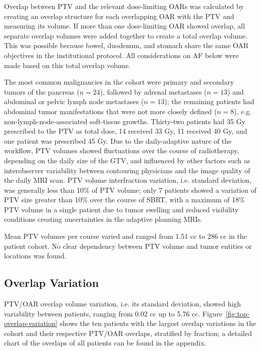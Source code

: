 \documentclass[11pt]{article}
\begin{document}
Overlap between PTV and the relevant dose-limiting OARs was calculated by creating an overlap structure for each overlapping OAR with the PTV and measuring its volume. If more than one dose-limiting OAR showed overlap, all separate overlap volumes were added together to create a total overlap volume. This was possible because bowel, duodenum, and stomach share the same OAR objectives in the institutional protocol. All considerations on AF below were made based on this total overlap volume.

The most common malignancies in the cohort were primary and secondary tumors of the pancreas ($n=24$), followed by adrenal metastases ($n=13$) and abdominal or pelvic lymph node metastases ($n=13$); the remaining patients had abdominal tumor manifestations that were not more closely defined ($n=8$), e.g. non-lymph-node-associated soft-tissue growths. Thirty-two patients had 35 Gy prescribed to the PTV as total dose, 14 received 33 Gy, 11 received 40 Gy, and one patient was prescribed 45 Gy. Due to the daily-adaptive nature of the workflow, PTV volumes showed fluctuations over the course of radiotherapy, depending on the daily size of the GTV, and influenced by other factors such as interobserver variability between contouring physicians and the image quality of the daily MRI scan. PTV volume interfraction variation, i.e. standard deviation, was generally less than 10\% of PTV volume; only 7 patients showed a variation of PTV size greater than 10\% over the course of SBRT, with a maximum of 18\% PTV volume in a single patient due to tumor swelling and reduced visibility conditions creating uncertainties in the adaptive planning MRIs.

Mean PTV volumes per course varied and ranged from 1.51 cc to 286 cc in the patient cohort. No clear dependency between PTV volume and tumor entities or locations was found.

\subsection{Overlap Variation}

PTV/OAR overlap volume variation, i.e. its standard deviation, showed high variability between patients, ranging from 0.02 cc up to 5.76 cc. Figure~\ref{fig:top-overlap-variation} shows the ten patients with the largest overlap variations in the cohort and their respective PTV/OAR overlaps, stratified by fraction; a detailed chart of the overlaps of all patients can be found in the appendix.
\end{document}
